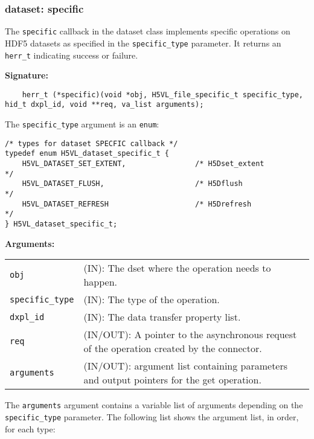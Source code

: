 \subsubsection{dataset: specific}
The \texttt{specific} callback in the dataset class implements specific operations on HDF5 datasets as specified in the \texttt{specific\_type} parameter. It returns an \texttt{herr\_t} indicating success or failure.\bigskip

\begin{mdframed}[style=bgbox]
\textbf{Signature:}
\begin{lstlisting}
    herr_t (*specific)(void *obj, H5VL_file_specific_t specific_type, hid_t dxpl_id, void **req, va_list arguments);
\end{lstlisting}

The \texttt{specific\_type} argument is an \texttt{enum}:
\begin{lstlisting}
/* types for dataset SPECFIC callback */
typedef enum H5VL_dataset_specific_t {                                           
    H5VL_DATASET_SET_EXTENT,                /* H5Dset_extent                       */
    H5VL_DATASET_FLUSH,                     /* H5Dflush                            */
    H5VL_DATASET_REFRESH                    /* H5Drefresh                          */
} H5VL_dataset_specific_t;
\end{lstlisting}

\textbf{Arguments:}\\
\begin{tabular}{l p{13.5cm}}
  \texttt{obj} & (IN): The dset  where the operation needs
  to happen.\\
  \texttt{specific\_type} & (IN): The type of the operation.\\
  \texttt{dxpl\_id} & (IN): The data transfer property list.\\
  \texttt{req} & (IN/OUT): A pointer to the asynchronous request of the
  operation created by the connector.\\
  \texttt{arguments} & (IN/OUT): argument list containing parameters and
  output pointers for the get operation. \\
\end{tabular}
\end{mdframed}

The \texttt{arguments} argument contains a variable list of arguments
depending on the \texttt{specific\_type} parameter. The following list shows
the argument list, in order, for each type:

